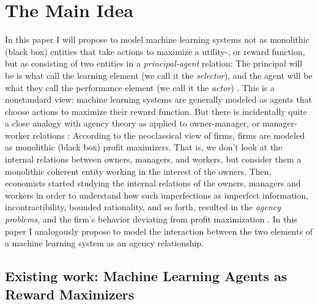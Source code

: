 \section{The Main Idea} \label{sec:existingwork}

\noindent In this paper I will propose to model machine learning systems not as monolithic (black box) entities that take actions to maximize a utility-, or reward function, but as consisting of two entities in a \textit{principal-agent} relation: The principal will be is what \citeauthor{Russell2010} call the learning element (we call it the \textit{selector}), and the agent will be what they call the performance element (we call it the \textit{actor}) \citeyearpar{Russell2010}. This is a nonstandard view: machine learning systems are generally modeled as agents that choose actions to maximize their reward function. But there is incidentally quite a close analogy with agency theory as applied to owner-manager, or manager-worker relations \citep{Stiglitz1989}: According to the neoclassical view of firms, firms are modeled as monolithic (black box) profit maximizers. That is, we don’t look at the internal relations between owners, managers, and workers, but consider them a monolithic coherent entity working in the interest of the owners. Then, economists started studying the internal relations of the owners, managers and workers in order to understand how such imperfections as imperfect information, incontractibility, bounded rationality, and so forth, resulted in the \textit{agency problems}, and the firm’s behavior deviating from profit maximization \citep{Ross1973,Williamson1975,Jensen1976, Fama1980}. In this paper I analogously propose to model the interaction between the two elements of a machine learning system as an agency relationship.








\subsection{Existing work: Machine Learning Agents as Reward Maximizers}\label{sec:existingwork:ML}


